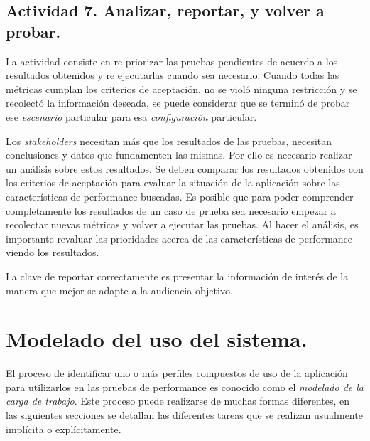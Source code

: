 \subsection{Actividad 7. Analizar, reportar, y volver a probar.}
La actividad consiste en re priorizar las pruebas pendientes de acuerdo a los resultados obtenidos y re ejecutarlas cuando sea necesario. Cuando todas las métricas cumplan los 
criterios de  aceptación, no se violó ninguna restricción y se recolectó la información deseada, se puede considerar que se terminó de probar ese \emph{escenario} particular para esa
\emph{configuración} particular.

Los \emph{stakeholders} necesitan más que los resultados de las pruebas, necesitan conclusiones y datos que fundamenten las mismas. Por ello es necesario
realizar un análisis sobre estos resultados. Se deben comparar los resultados obtenidos con los criterios de aceptación para evaluar la situación de la aplicación sobre las
características de performance buscadas. Es posible que para poder comprender completamente los resultados de un caso de prueba sea necesario empezar a recolectar
nuevas métricas y volver a ejecutar las pruebas. Al hacer el análisis, es importante revaluar las prioridades acerca de las características de performance viendo los resultados.

La clave de reportar correctamente es presentar la información de interés de la manera que mejor se adapte a la audiencia objetivo.

\section{Modelado del uso del sistema.}
\label{cap2:modelado_uso}

El proceso de identificar uno o más perfiles compuestos de uso de la aplicación para utilizarlos en las pruebas de performance es conocido como el \emph{modelado de la carga de
trabajo}. Este proceso puede realizarse de muchas formas diferentes, en las siguientes secciones se detallan las diferentes tareas que se realizan usualmente implícita o explícitamente.

